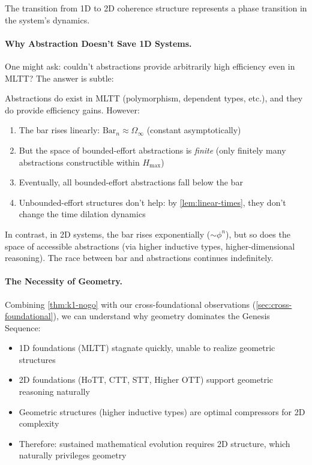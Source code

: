 \documentclass[11pt]{article}
\theoremstyle{definition}
\theoremstyle{remark}
\begin{document}
The transition from 1D to 2D coherence structure represents a phase transition in the system's dynamics.

\paragraph{Why Abstraction Doesn't Save 1D Systems.}

One might ask: couldn't abstractions provide arbitrarily high efficiency even in MLTT? The answer is subtle:

Abstractions do exist in MLTT (polymorphism, dependent types, etc.), and they do provide efficiency gains. However:
\begin{enumerate}
\item The bar rises linearly: $\mathrm{Bar}_n \approx \Omega_{\infty}$ (constant asymptotically)
\item But the space of bounded-effort abstractions is \emph{finite} (only finitely many abstractions constructible within $H_{\max}$)
\item Eventually, all bounded-effort abstractions fall below the bar
\item Unbounded-effort structures don't help: by \cref{lem:linear-times}, they don't change the time dilation dynamics
\end{enumerate}

In contrast, in 2D systems, the bar rises exponentially ($\sim \phi^n$), but so does the space of accessible abstractions (via higher inductive types, higher-dimensional reasoning). The race between bar and abstractions continues indefinitely.

\paragraph{The Necessity of Geometry.}

Combining \cref{thm:k1-nogo} with our cross-foundational observations (\cref{sec:cross-foundational}), we can understand why geometry dominates the Genesis Sequence:

\begin{itemize}
\item 1D foundations (MLTT) stagnate quickly, unable to realize geometric structures
\item 2D foundations (HoTT, CTT, STT, Higher OTT) support geometric reasoning naturally
\item Geometric structures (higher inductive types) are optimal compressors for 2D complexity
\item Therefore: sustained mathematical evolution requires 2D structure, which naturally privileges geometry
\end{itemize}
\end{document}
